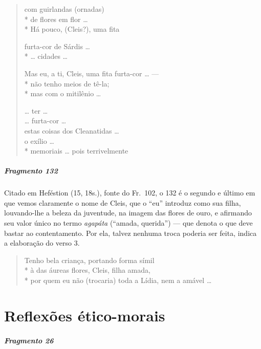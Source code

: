 {\begin{verse}
com guirlandas (ornadas)\\*
de flores em flor \ldots{}\\*
Há pouco, (Cleis?), uma fita

furta-cor de Sárdis \ldots{}\\*
\ldots{} cidades \ldots{}

Mas eu, a ti, Cleis, uma fita furta-cor \ldots{} ---\\*
não tenho meios de tê-la; \\*
mas com o mitilênio \ldots{}

\ast\quad\ast\quad\ast

\ldots{} ter \ldots{}\\
\ldots{} furta-cor \ldots{}\\
estas coisas dos Cleanatidas \ldots{}\\
o exílio \ldots{}\\*
memoriais \ldots{} pois terrivelmente 
\end{verse}

\paragraph{Fragmento 132}

{\small Citado em Heféstion (15, 18s.), fonte do Fr.~102, o 132 é o segundo e último em que vemos claramente o nome de Cleis, que o “eu” introduz como sua filha, louvando-lhe a
beleza da juventude, na imagem das flores de ouro, e afirmando seu valor único no termo \textit{agapáta} (``amada, querida'') --- que denota o que deve bastar ao contentamento. Por ela,  talvez nenhuma troca poderia ser feita, indica a elaboração do verso 3.}

\begin{verse}
Tenho bela criança, portando forma símil\\*
à das áureas flores, Cleis, filha amada,\\*
por quem eu não (trocaria) toda a Lídia, nem a \qb{}amável \ldots{}
\end{verse}


\chapter{Reflexões ético-morais}

\paragraph{Fragmento 26}

}
